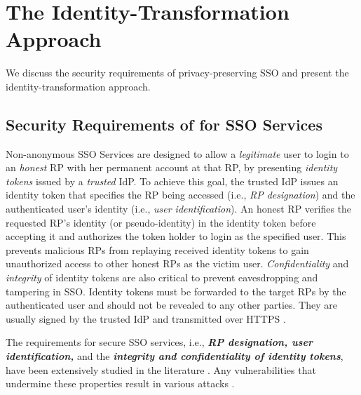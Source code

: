 \section{The Identity-Transformation Approach}
\label{sec:challenge}

We discuss the security requirements of privacy-preserving SSO and present the identity-transformation approach.


\subsection{Security Requirements of for SSO Services}
\label{subsec:basicrequirements}

Non-anonymous SSO Services \cite{OpenIDConnect,rfc6749,SAML,SAMLIdentifier,NIST2017draft} are designed to allow a \emph{legitimate} user to login to an \emph{honest} RP with her permanent account at that RP, %
by presenting \emph{identity tokens} issued by a \emph{trusted} IdP. To achieve this goal, the trusted IdP issues an identity token that specifies the RP being accessed (i.e., \emph{RP designation}) and  the authenticated user's identity (i.e., \emph{user identification}). An honest RP verifies the requested RP's identity (or pseudo-identity) in the identity token before accepting it and authorizes the token holder to login as the specified user. This prevents malicious RPs from replaying received identity tokens to gain unauthorized access to other honest RPs as the victim user.
\emph{Confidentiality} and \emph{integrity} of identity tokens are also critical to prevent eavesdropping and tampering in SSO. Identity tokens must be forwarded to the target RPs by the authenticated user and should not be revealed to any other parties. %
They are usually signed by the trusted IdP and transmitted over HTTPS \cite{OpenIDConnect,rfc6749,SAML}.

The requirements for secure SSO services, i.e., {\bf {\em RP designation, user identification,}} and the {\bf {\em integrity and confidentiality of identity tokens}}, have been extensively studied in the literature \cite{ArmandoCCCT08, FettKS16, FettKS17}.
Any vulnerabilities that undermine these properties result in various attacks \cite{SomorovskyMSKJ12, WangCW12, ArmandoCCCPS13, ZhouE14, WangZLLYLG15, WangZLG16, YangLLZH16, MainkaMS16, MainkaMSW17, YangLCZ18, YangLS17, ShiWL19, ChenPCTKT14, ccsSunB12, DiscoveringJCS, dimvaLiM16, CaoSBKVC14, TowardsShehabM14}.


